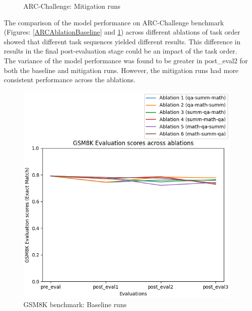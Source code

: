 \begin{figure}[H]
\begin{minipage}{0.45\textwidth}
        \captionsetup{width=1.1\textwidth}
        \caption{ARC-Challenge: Mitigation runs}
        \label{ARCAblationMitigation}
    \end{minipage}
\end{figure}
The comparison of the model performance on ARC-Challenge benchmark (Figures: \ref{ARCAblationBaseline} and \ref{ARCAblationMitigation}) across different ablations of task order showed that different task sequences yielded different results. This difference in results in the final post-evaluation stage could be an impact of the task order. The variance of the model performance was found to be greater in post\_eval2 for both the baseline and mitigation runs. However, the mitigation runs had more consistent performance across the ablations. 

\begin{figure}[H]
    \centering
    \begin{minipage}{0.45\textwidth}
        \centering
        \includegraphics[width=1.1\textwidth]{Figures/results/trace_baseline_graphs/gsm8k/gsm8k_eval_baseline.png}
        \captionsetup{width=1.1\textwidth}
        \caption{GSM8K benchmark: Baseline runs}
        \label{GSM8KBaseline}
    \end{minipage}\hfill
    \begin{minipage}{0.45\textwidth}
        \centering

\end{minipage}
\end{figure}
